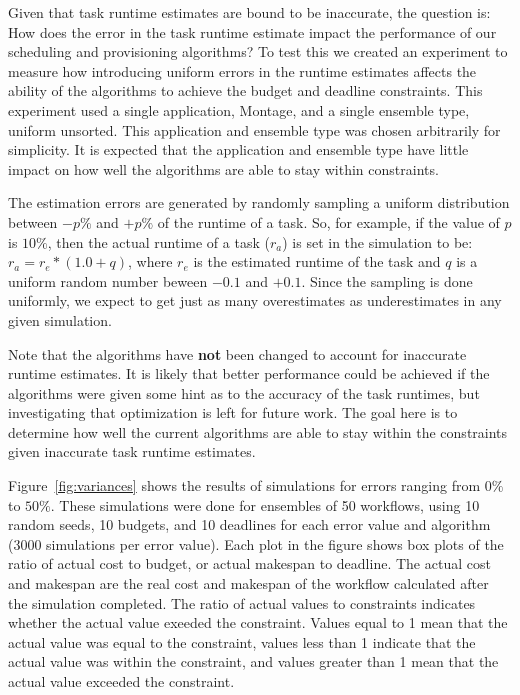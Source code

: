 \documentclass[conference]{IEEEtran}
\begin{document}
Given that task runtime estimates are bound to be inaccurate, the question is: How does the error in the task runtime estimate impact the performance of our scheduling and provisioning algorithms? To test this we created an experiment to measure how introducing uniform errors in the runtime estimates affects the ability of the algorithms to achieve the budget and deadline constraints. This experiment used a single application, Montage, and a single ensemble type, uniform unsorted. This application and ensemble type was chosen arbitrarily for simplicity. It is expected that the application and ensemble type have little impact on how well the algorithms are able to stay within constraints.

The estimation errors are generated by randomly sampling a uniform distribution between $-p\%$ and $+p\%$ of the runtime of a task. So, for example, if the value of $p$ is $10\%$, then the actual runtime of a task ($r_a$) is set in the simulation to be: $r_a = r_e * (1.0 + q)$, where $r_e$ is the estimated runtime of the task and $q$ is a uniform random number beween $-0.1$ and $+0.1$. Since the sampling is done uniformly, we expect to get just as many overestimates as underestimates in any given simulation.

Note that the algorithms have \textbf{not} been changed to account for inaccurate runtime estimates. It is likely that better performance could be achieved if the algorithms were given some hint as to the accuracy of the task runtimes, but investigating that optimization is left for future work. The goal here is to determine how well the current algorithms are able to stay within the constraints given inaccurate task runtime estimates.

Figure~\ref{fig:variances} shows the results of simulations for errors ranging from $0\%$ to $50\%$. These simulations were done for ensembles of 50 workflows, using 10 random seeds, 10 budgets, and 10 deadlines for each error value and algorithm (3000 simulations per error value). Each plot in the figure shows box plots of the ratio of actual cost to budget, or actual makespan to deadline. The actual cost and makespan are the real cost and makespan of the workflow calculated after the simulation completed. The ratio of actual values to constraints indicates whether the actual value exeeded the constraint. Values equal to 1 mean that the actual value was equal to the constraint, values less than 1 indicate that the actual value was within the constraint, and values greater than 1 mean that the actual value exceeded the constraint.
\end{document}
